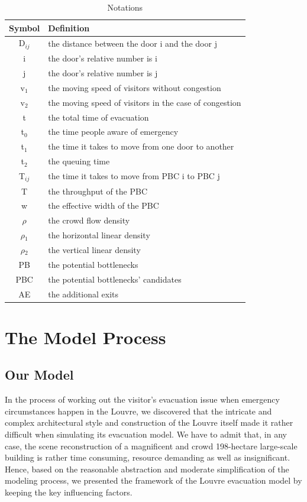 \documentclass[12pt]{article}
\begin{document}
\begin{table}[htbp] 
\begin{center}
\caption{Notations}
\begin{tabular}{cl}
	\toprule
	\multicolumn{1}{m{3cm}}{\centering Symbol}
	&\multicolumn{1}{m{8cm}}{Definition}\\
	\midrule
	D$_{ij}$ &the distance between the door i and the door j \\
        i &the door's relative number is i \\
        j &the door's relative number is j \\
        v$_{1}$ &the moving speed of visitors without congestion \\
		v$_{2}$ &the moving speed of visitors in the case of congestion \\  
		t &the total time of evacuation \\
		t$_{0}$ &the time people aware of emergency \\ 
        t$_{1}$ &the time it takes to move from one door to another \\
        t$_{2}$ &the queuing time \\
        T$_{ij}$ &the time it takes to move from PBC i to PBC j \\
        T &the throughput of the PBC \\
        w &the effective width of the PBC \\
        $\rho$ &the crowd flow density \\
        $\rho$$_{1}$ &the horizontal linear density \\
		$\rho$$_{2}$ &the vertical linear density \\
		PB           &the potential bottlenecks\\
		PBC          &the potential bottlenecks' candidates\\
		AE           &the additional exits\\
	\bottomrule
\end{tabular}\label{tb:notation}
\end{center}
\end{table}

\section{The Model Process}
\subsection{Our Model}
In the process of working out the visitor's evacuation issue when emergency circumstances happen in the Louvre, we discovered that the intricate and complex architectural style and construction of the Louvre itself made it rather difficult when simulating its evacuation model. We have to admit that, in any case, the scene reconstruction of a magnificent and crowd 198-hectare large-scale building is rather time consuming, resource demanding as well as insignificant. Hence, based on the reasonable abstraction and moderate simplification of the modeling process, we presented the framework of the Louvre evacuation model by keeping the key influencing factors.
\end{document}
